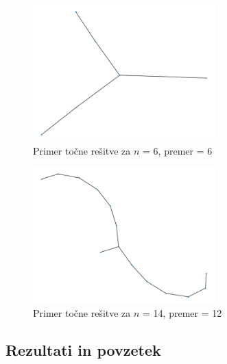 \documentclass[a4paper, 12 pt]{article}
\begin{document}
\begin{figure}[H]
\centering
  \includegraphics[width=7cm]{drevo6diam4.png}
  \caption{Primer točne rešitve za $n$ = 6, premer = 6}
  \label{fig:graf1} 
\end{figure}

\begin{figure}[H]
\centering
  \includegraphics[width=7cm]{drevo14diam12.png}
  \caption{Primer točne rešitve za $n$ = 14, premer = 12}
  \label{fig:graf1}
\end{figure}



\subsection{Rezultati in povzetek}
\end{document}

